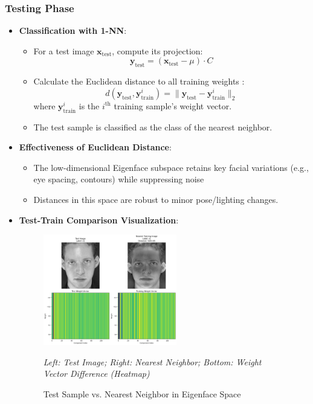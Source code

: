 \documentclass{article}
\begin{document}
	
	\subsubsection{Testing Phase}
	\begin{itemize}
		\item \textbf{Classification with 1-NN}:
		\begin{itemize}
			\item For a test image \(\mathbf{x}_{\text{test}}\), compute its projection:
			\[
			\mathbf{y}_{\text{test}} = (\mathbf{x}_{\text{test}} - \mu) \cdot C
			\]
			\item Calculate the Euclidean distance to all training weights \cite{Turk1991}:
			\[
			d(\mathbf{y}_{\text{test}}, \mathbf{y}_{\text{train}}^i) = \|\mathbf{y}_{\text{test}} - \mathbf{y}_{\text{train}}^i\|_2
			\]
			where \(\mathbf{y}_{\text{train}}^i\) is the \(i^{\text{th}}\) training sample's weight vector.
			\item The test sample is classified as the class of the nearest neighbor.
		\end{itemize}
		
		\item \textbf{Effectiveness of Euclidean Distance}:
		\begin{itemize}
			\item The low-dimensional Eigenface subspace retains key facial variations (e.g., eye spacing, contours) while suppressing noise 
			\item Distances in this space are robust to minor pose/lighting changes.
		\end{itemize}
		
		\item \textbf{Test-Train Comparison Visualization}:
		\begin{figure}[h!]
			\centering
			\includegraphics[width=0.55\textwidth]{test_comparison.png}
			\caption{Test Sample vs. Nearest Neighbor in Eigenface Space}
			\label{fig:comparison}
			\vspace{5pt}
			\small \textit{Left: Test Image; Right: Nearest Neighbor; Bottom: Weight Vector Difference (Heatmap)}
		\end{figure}
	\end{itemize}
\end{document}
